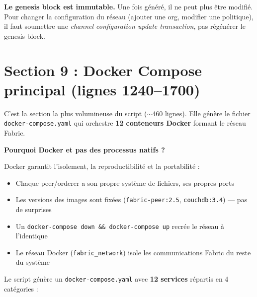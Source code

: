 \documentclass[12pt,a4paper,twoside]{report}
\begin{document}
\begin{warningbox}
\textbf{Le genesis block est immutable.} Une fois généré, il ne peut plus être modifié. Pour changer la configuration du réseau (ajouter une org, modifier une politique), il faut soumettre une \textit{channel configuration update transaction}, pas régénérer le genesis block.
\end{warningbox}

\section{Section 9 : Docker Compose principal (lignes 1240--1700)}

C'est la section la plus volumineuse du script ($\sim$460 lignes). Elle génère le fichier \texttt{docker-compose.yaml} qui orchestre \textbf{12 conteneurs Docker} formant le réseau Fabric.

\begin{infobox}
\textbf{Pourquoi Docker et pas des processus natifs ?}

Docker garantit l'isolement, la reproductibilité et la portabilité :
\begin{itemize}
    \item Chaque peer/orderer a son propre système de fichiers, ses propres ports
    \item Les versions des images sont fixées (\texttt{fabric-peer:2.5}, \texttt{couchdb:3.4}) --- pas de surprises
    \item Un \texttt{docker-compose down \&\& docker-compose up} recrée le réseau à l'identique
    \item Le réseau Docker (\texttt{fabric\_network}) isole les communications Fabric du reste du système
\end{itemize}
\end{infobox}

Le script génère un \texttt{docker-compose.yaml} avec \textbf{12 services} répartis en 4 catégories :
\end{document}
